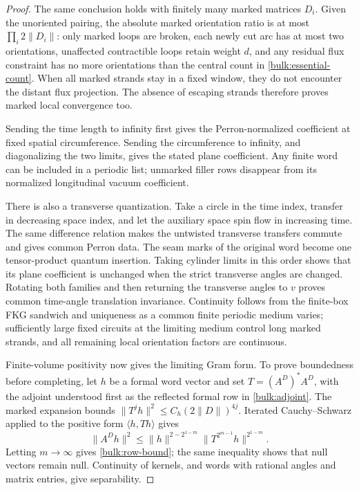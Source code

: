 \begin{proof}
The same conclusion holds with finitely many marked matrices
$D_i$. Given the unoriented pairing, the absolute marked
orientation ratio is at most $\prod_i2\|D_i\|$: only marked loops
are broken, each newly cut arc has at most two orientations,
unaffected contractible loops retain weight $d$, and any residual
flux constraint has no more orientations than the central count
in \eqref{bulk:essential-count}. When all marked strands stay in
a fixed window, they do not encounter the distant flux projection.
The absence of escaping strands therefore proves marked local
convergence too.

Sending the time length to infinity first gives the
Perron-normalized coefficient at fixed spatial circumference.
Sending the circumference to infinity, and diagonalizing the two
limits, gives the stated plane coefficient. Any finite word can
be included in a periodic list; unmarked filler rows disappear
from its normalized longitudinal vacuum coefficient.

There is also a transverse quantization. Take a circle in the time
index, transfer in decreasing space index, and let the auxiliary
space spin flow in increasing time. The same difference relation
makes the untwisted transverse transfers commute and gives common
Perron data. The seam marks of the original word become one
tensor-product quantum insertion. Taking cylinder limits in this
order shows that its plane coefficient is unchanged when the
strict transverse angles are changed. Rotating both families and
then returning the transverse angles to $v$ proves common
time-angle translation invariance. Continuity follows from the
finite-box FKG sandwich and uniqueness as a common finite periodic
medium varies; sufficiently large fixed circuits at the limiting
medium control long marked strands, and all remaining local
orientation factors are continuous.

Finite-volume positivity now gives the limiting Gram form. To
prove boundedness before completing, let $h$ be a formal word
vector and set $T=(A^D)^*A^D$, with the adjoint understood first
as the reflected formal row in \eqref{bulk:adjoint}. The
marked expansion bounds
$\|T^jh\|^2\le C_h(2\|D\|)^{4j}$. Iterated Cauchy--Schwarz applied
to the positive form $\langle h,Th\rangle$ gives
\[
 \|A^Dh\|^2
 \le \|h\|^{2-2^{1-m}}
       \|T^{2^{m-1}}h\|^{2^{1-m}}.
\]
Letting $m\to\infty$ gives \eqref{bulk:row-bound}; the same inequality
shows that null vectors remain null. Continuity of kernels, and
words with rational angles and matrix entries, give separability.
\end{proof}

